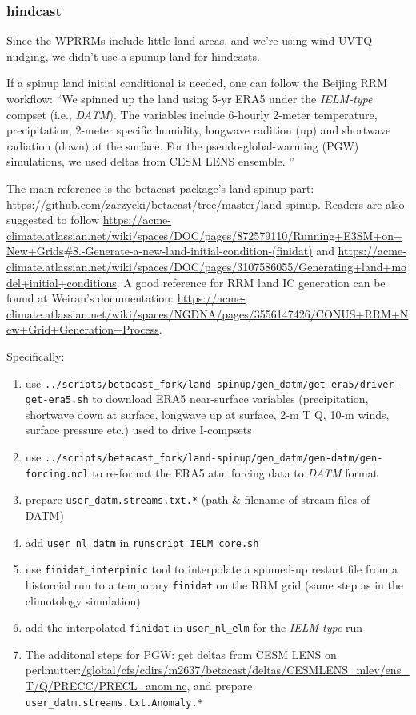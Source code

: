 \documentclass[journal abbreviation, manuscript]{copernicus}
\begin{document}
\subsubsection{hindcast}
Since the WPRRMs include little land areas, and we're using wind UVTQ nudging, we didn't use a spunup land for hindcasts. 

If a spinup land initial conditional is needed, one can follow the Beijing RRM workflow: ``We spinned up the land using 5-yr ERA5 under the \emph{IELM-type} compset (i.e., \emph{DATM}). The variables include 6-hourly 2-meter temperature, precipitation, 2-meter specific humidity, longwave radition (up) and shortwave radiation (down) at the surface. For the pseudo-global-warming (PGW) simulations, we used deltas from CESM LENS ensemble. ''

The main reference is the betacast package's land-spinup part: \url{https://github.com/zarzycki/betacast/tree/master/land-spinup}. Readers are also suggested to follow \url{https://acme-climate.atlassian.net/wiki/spaces/DOC/pages/872579110/Running+E3SM+on+New+Grids#8.-Generate-a-new-land-initial-condition-(finidat)} and \url{https://acme-climate.atlassian.net/wiki/spaces/DOC/pages/3107586055/Generating+land+model+initial+conditions}. A good reference for RRM land IC generation can be found at Weiran's documentation: \url{https://acme-climate.atlassian.net/wiki/spaces/NGDNA/pages/3556147426/CONUS+RRM+New+Grid+Generation+Process}. 

Specifically:
\begin{enumerate}
\item use \lstinline|../scripts/betacast_fork/land-spinup/gen_datm/get-era5/driver-get-era5.sh| to download ERA5 near-surface variables (precipitation, shortwave down at surface, longwave up at surface, 2-m T Q, 10-m winds, surface pressure etc.) used to drive I-compsets
\item use \lstinline|../scripts/betacast_fork/land-spinup/gen_datm/gen-datm/gen-forcing.ncl| to re-format the ERA5 atm forcing data to \emph{DATM} format
\item prepare \verb|user_datm.streams.txt.*| (path \& filename of stream files of DATM)
\item add \verb|user_nl_datm| in \verb|runscript_IELM_core.sh|
\item use \verb|finidat_interpinic| tool to interpolate a spinned-up restart file from a historcial run to a temporary \verb|finidat| on the RRM grid (same step as in the climotology simulation)
\item add the interpolated \verb|finidat| in \verb|user_nl_elm| for the \emph{IELM-type} run
\item The additonal steps for PGW: get deltas from CESM LENS on perlmutter:\url{/global/cfs/cdirs/m2637/betacast/deltas/CESMLENS_mlev/ens_T/Q/PRECC/PRECL_anom.nc}, and prepare \verb|user_datm.streams.txt.Anomaly.*|
\end{enumerate}
\vspace{\baselineskip}
\end{document}
